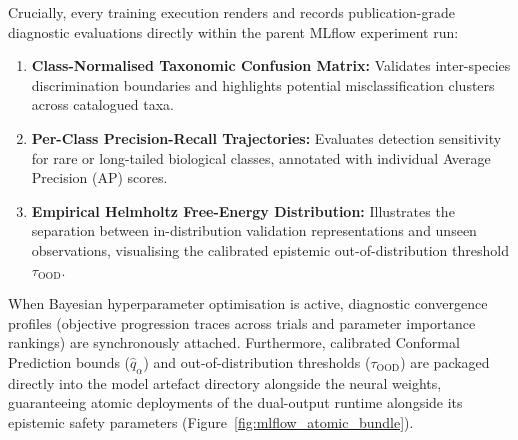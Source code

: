 Crucially, every training execution renders and records publication-grade diagnostic evaluations directly within the parent MLflow experiment run:
\begin{enumerate}
    \item \textbf{Class-Normalised Taxonomic Confusion Matrix:} Validates inter-species discrimination boundaries and highlights potential misclassification clusters across catalogued taxa.
    \item \textbf{Per-Class Precision-Recall Trajectories:} Evaluates detection sensitivity for rare or long-tailed biological classes, annotated with individual Average Precision (AP) scores.
    \item \textbf{Empirical Helmholtz Free-Energy Distribution:} Illustrates the separation between in-distribution validation representations and unseen observations, visualising the calibrated epistemic out-of-distribution threshold $\tau_{\text{OOD}}$.
\end{enumerate}
When Bayesian hyperparameter optimisation is active, diagnostic convergence profiles (objective progression traces across trials and parameter importance rankings) are synchronously attached. Furthermore, calibrated Conformal Prediction bounds ($\hat{q}_\alpha$) and out-of-distribution thresholds ($\tau_{\text{OOD}}$) are packaged directly into the model artefact directory alongside the neural weights, guaranteeing atomic deployments of the dual-output runtime alongside its epistemic safety parameters (Figure~\ref{fig:mlflow_atomic_bundle}).

